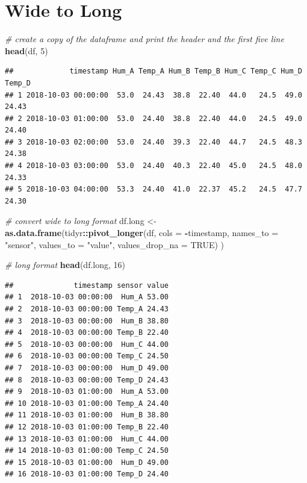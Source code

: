 \documentclass[
]{book}
\newenvironment{Shaded}{\begin{snugshade}}{\end{snugshade}}
\newcommand{\CommentTok}[1]{\textcolor[rgb]{0.56,0.35,0.01}{\textit{#1}}}
\newcommand{\DataTypeTok}[1]{\textcolor[rgb]{0.13,0.29,0.53}{#1}}
\newcommand{\DecValTok}[1]{\textcolor[rgb]{0.00,0.00,0.81}{#1}}
\newcommand{\KeywordTok}[1]{\textcolor[rgb]{0.13,0.29,0.53}{\textbf{#1}}}
\newcommand{\NormalTok}[1]{#1}
\newcommand{\OperatorTok}[1]{\textcolor[rgb]{0.81,0.36,0.00}{\textbf{#1}}}
\newcommand{\OtherTok}[1]{\textcolor[rgb]{0.56,0.35,0.01}{#1}}
\newcommand{\StringTok}[1]{\textcolor[rgb]{0.31,0.60,0.02}{#1}}
\begin{document}
\hypertarget{wide-to-long}{%
\section{Wide to Long}\label{wide-to-long}}

\begin{Shaded}
\begin{Highlighting}[]
\CommentTok{# create a copy of the dataframe and print the header and the first five line}
\KeywordTok{head}\NormalTok{(df, }\DecValTok{5}\NormalTok{)}
\end{Highlighting}
\end{Shaded}

\begin{verbatim}
##             timestamp Hum_A Temp_A Hum_B Temp_B Hum_C Temp_C Hum_D Temp_D
## 1 2018-10-03 00:00:00  53.0  24.43  38.8  22.40  44.0   24.5  49.0  24.43
## 2 2018-10-03 01:00:00  53.0  24.40  38.8  22.40  44.0   24.5  49.0  24.40
## 3 2018-10-03 02:00:00  53.0  24.40  39.3  22.40  44.7   24.5  48.3  24.38
## 4 2018-10-03 03:00:00  53.0  24.40  40.3  22.40  45.0   24.5  48.0  24.33
## 5 2018-10-03 04:00:00  53.3  24.40  41.0  22.37  45.2   24.5  47.7  24.30
\end{verbatim}

\begin{Shaded}
\begin{Highlighting}[]
\CommentTok{# convert wide to long format}
\NormalTok{df.long <-}\StringTok{ }\KeywordTok{as.data.frame}\NormalTok{(tidyr}\OperatorTok{::}\KeywordTok{pivot_longer}\NormalTok{(df,}
                                      \DataTypeTok{cols =} \OperatorTok{-}\NormalTok{timestamp,}
                                      \DataTypeTok{names_to =} \StringTok{"sensor"}\NormalTok{,}
                                      \DataTypeTok{values_to =} \StringTok{"value"}\NormalTok{,}
                                      \DataTypeTok{values_drop_na =} \OtherTok{TRUE}\NormalTok{)}
\NormalTok{                         )}

\CommentTok{# long format}
\KeywordTok{head}\NormalTok{(df.long, }\DecValTok{16}\NormalTok{)}
\end{Highlighting}
\end{Shaded}

\begin{verbatim}
##              timestamp sensor value
## 1  2018-10-03 00:00:00  Hum_A 53.00
## 2  2018-10-03 00:00:00 Temp_A 24.43
## 3  2018-10-03 00:00:00  Hum_B 38.80
## 4  2018-10-03 00:00:00 Temp_B 22.40
## 5  2018-10-03 00:00:00  Hum_C 44.00
## 6  2018-10-03 00:00:00 Temp_C 24.50
## 7  2018-10-03 00:00:00  Hum_D 49.00
## 8  2018-10-03 00:00:00 Temp_D 24.43
## 9  2018-10-03 01:00:00  Hum_A 53.00
## 10 2018-10-03 01:00:00 Temp_A 24.40
## 11 2018-10-03 01:00:00  Hum_B 38.80
## 12 2018-10-03 01:00:00 Temp_B 22.40
## 13 2018-10-03 01:00:00  Hum_C 44.00
## 14 2018-10-03 01:00:00 Temp_C 24.50
## 15 2018-10-03 01:00:00  Hum_D 49.00
## 16 2018-10-03 01:00:00 Temp_D 24.40
\end{verbatim}
\end{document}
